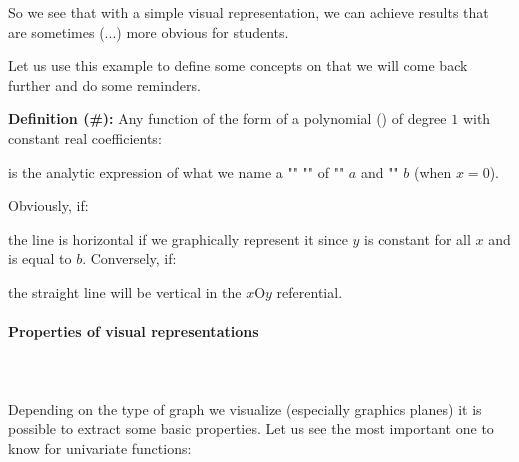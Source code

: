 	So we see that with a simple visual representation, we can achieve results that are sometimes (...) more obvious for students.
	
	Let us use this example to define some concepts on that we will come back further and do some reminders.
	
	\textbf{Definition (\#\mydef):} Any function of the form of a polynomial () of degree $1$ with constant real coefficients:
	
	is the analytic expression of what we name a "\label{straight line}" "" of "" $a$ and "" $b$ (when $x=0$).
	
	Obviously, if:
	
	the line is horizontal if we graphically represent it since $y$ is constant for all $x$ and is equal to $b$. Conversely, if:
	
	the straight line will be vertical in the $x\text{O}y$ referential.
	
	\paragraph{Properties of visual representations}\mbox{}\\\\
	Depending on the type of graph we visualize (especially graphics planes) it is possible to extract some basic properties. Let us see the most important one to know for univariate functions:
	
